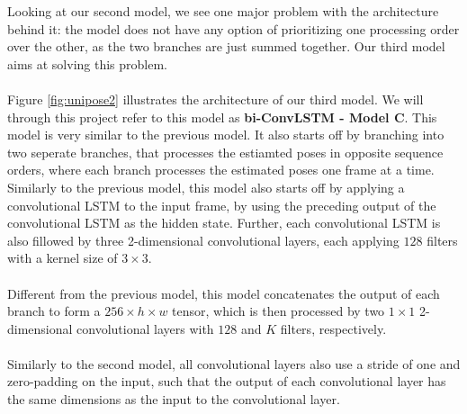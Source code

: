 \documentclass[./main.tex]{subfiles}
\begin{document}
\noindent Looking at our second model, we see one major problem with the architecture behind it: the model does not have any option of prioritizing one processing order over the other, as the two branches are just summed together. Our third model aims at solving this problem.
\\
\\
Figure \ref{fig:unipose2} illustrates the architecture of our third model. We will through this project refer to this model as \textbf{bi-ConvLSTM - Model C}. This model is very similar to the previous model. It also starts off by branching into two seperate branches, that processes the estiamted poses in opposite sequence orders, where each branch processes the estimated poses one frame at a time. Similarly to the previous model, this model also starts off by applying a convolutional LSTM to the input frame, by using the preceding output of the convolutional LSTM as the hidden state. Further, each convolutional LSTM is also fillowed by three 2-dimensional convolutional layers, each applying $128$ filters with a kernel size of $3 \times 3$. 
\\
\\
Different from the previous model, this model concatenates the output of each branch to form a $256 \times h \times w$ tensor, which is then processed by two $1 \times 1$ 2-dimensional convolutional layers with $128$ and $K$ filters, respectively.
\\
\\
Similarly to the second model, all convolutional layers also use a stride of one and zero-padding on the input, such that the output of each convolutional layer has the same dimensions as the input to the convolutional layer.
\end{document}
